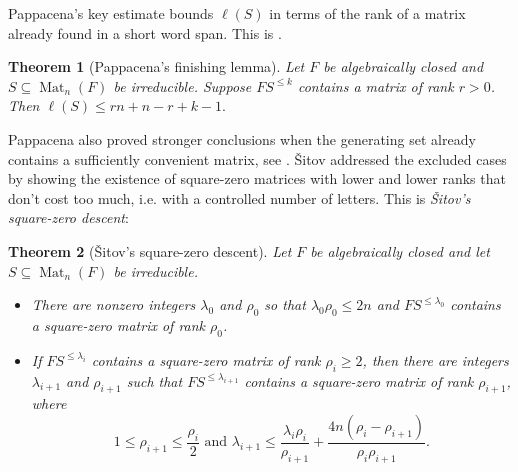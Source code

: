 \documentclass[11pt]{article}
\newtheorem{theorem}{Theorem}[section]
\renewcommand{\geq}{\geqslant}
\renewcommand{\leq}{\leqslant}
\newcommand{\Mat}{\operatorname{Mat}}
\newtheorem{auxiliary proposition}[theorem]{Auxiliary Proposition}
\newtheorem{main conjecture}[theorem]{Main Conjecture}
\newtheorem{main theorem}[theorem]{Main Theorem}
\newtheorem{modesty proposition}[theorem]{Modesty Proposition}
\newtheorem{open problem}[theorem]{Open Problem}
\newtheorem{convergence lemma}[theorem]{Convergence Lemma}
\newtheorem{corrected lemma}[theorem]{Corrected Lemma}
\newtheorem{growth lemma}[theorem]{Growth Lemma}
\newtheorem{coefficient lemma}[theorem]{Integrality Lemma}
\newtheorem{interpolation lemma}[theorem]{Interpolation Lemma}
\newtheorem{kernel lemma}[theorem]{Kernel Lemma}
\newtheorem{limit lemma}[theorem]{Limit Lemma}
\newtheorem{tandem lemma}[theorem]{Modesty Lemma}
\newtheorem{zero-finding lemma}[theorem]{Zero-Finding Lemma}
\numberwithin{equation}{section}
\begin{document}

Pappacena's key estimate bounds $\ell(S)$ in terms of the rank of a matrix already found in a short word span. This is \cite[Theorem~4.1(a)]{Pappacena1997}.%

\begin{theorem}[Pappacena's finishing lemma]%
\label{thm:pappacena-rank}
Let $F$ be algebraically closed and $S\subseteq \Mat_n(F)$ be irreducible.  Suppose $F S^{\leq k}$ contains a matrix of rank $r>0$.  Then $\ell(S)\leq rn+n-r+k-1.
$
\end{theorem}


Pappacena also proved stronger conclusions when the generating set already contains a sufficiently convenient matrix, see \cite[Theorem~4.1(b),(c)]{Pappacena1997}. \v{S}itov addressed the excluded cases by showing the existence of square-zero matrices with lower and lower ranks that don't cost too much, i.e. with a controlled  number of letters. This is \textit{\v{S}itov's square-zero descent}:

\begin{theorem}[\v{S}itov's square-zero descent]
\label{thm:shitov-descent}
Let $F$ be algebraically closed and let $S\subseteq \Mat_n(F)$ be irreducible.
\begin{itemize} 
    \item There are nonzero integers $\lambda_0$ and $\rho_0$ so that $\lambda_0\rho_0\leq 2n$ and $F S^{\leq \lambda_0}$ contains a square-zero matrix of rank $\rho_0$.
     \item If $F S^{\leq \lambda_i}$ contains a square-zero matrix of rank $\rho_i\geq2$, then there are integers $\lambda_{i+1}$ and $\rho_{i+1}$ such that $F S^{\leq \lambda_{i+1}}$ contains a square-zero matrix of rank $\rho_{i+1}$, where $$1\leq \rho_{i+1}\leq \frac{\rho_i}{2} \text{ and }\lambda_{i+1}\leq\frac{\lambda_i\rho_i}{\rho_{i+1}}+\frac{4n(\rho_i-\rho_{i+1})}{\rho_i\rho_{i+1}}.$$
\end{itemize}
\end{theorem}
\end{document}

